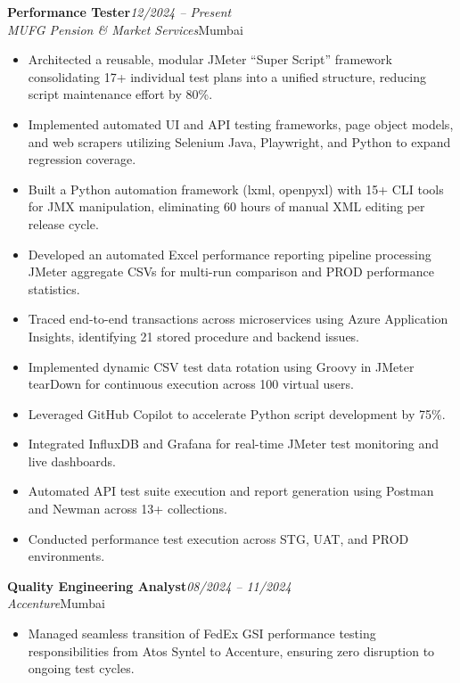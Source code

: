\documentclass[11pt,a4paper]{article}
\newcommand{\jobheader}[4]{%
  \noindent\textbf{#1}\hfill\textit{#3}\\
  \textit{#2}\hfill{#4}\\[2pt]
}
\newenvironment{tightitemize}{%
  \begin{itemize}[leftmargin=1.3em, itemsep=3pt, topsep=4pt, parsep=0pt]
}{%
  \end{itemize}
  \vspace{4pt}
}
\begin{document}
\jobheader{Performance Tester}{MUFG Pension \& Market Services}{12/2024 -- Present}{Mumbai}
\begin{tightitemize}
  \item Architected a reusable, modular JMeter ``Super Script'' framework consolidating 17+ individual test plans
    into a unified structure, reducing script maintenance effort by 80\%.
  \item Implemented automated UI and API testing frameworks, page object models, and web scrapers utilizing
    Selenium Java, Playwright, and Python to expand regression coverage.
  \item Built a Python automation framework (lxml, openpyxl) with 15+ CLI tools for JMX manipulation, eliminating
    60 hours of manual XML editing per release cycle.
  \item Developed an automated Excel performance reporting pipeline processing JMeter aggregate CSVs for
    multi-run comparison and PROD performance statistics.
  \item Traced end-to-end transactions across microservices using Azure Application Insights, identifying 21
    stored procedure and backend issues.
  \item Implemented dynamic CSV test data rotation using Groovy in JMeter tearDown for continuous execution
    across 100 virtual users.
  \item Leveraged GitHub Copilot to accelerate Python script development by 75\%.
  \item Integrated InfluxDB and Grafana for real-time JMeter test monitoring and live dashboards.
  \item Automated API test suite execution and report generation using Postman and Newman across 13+ collections.
  \item Conducted performance test execution across STG, UAT, and PROD environments.
\end{tightitemize}

\jobheader{Quality Engineering Analyst}{Accenture}{08/2024 -- 11/2024}{Mumbai}
\begin{tightitemize}
  \item Managed seamless transition of FedEx GSI performance testing responsibilities from Atos Syntel to
    Accenture, ensuring zero disruption to ongoing test cycles.
\end{tightitemize}
\end{document}
